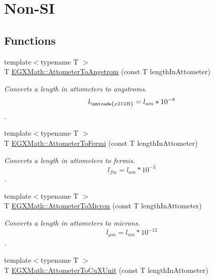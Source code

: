 \hypertarget{group___e_g_x_math-_conversions-_length_conversions-_s_i-_attometer-_non-_s_i}{}\section{Non-\/\+SI}
\label{group___e_g_x_math-_conversions-_length_conversions-_s_i-_attometer-_non-_s_i}
\subsection*{Functions}
\begin{DoxyCompactItemize}
\item 
{\footnotesize template$<$typename T $>$ }\\T \mbox{\hyperlink{group___e_g_x_math-_conversions-_length_conversions-_s_i-_attometer-_non-_s_i_ga331ff6e8159f6f00bb7a20e39fa4d756}{E\+G\+X\+Math\+::\+Attometer\+To\+Angstrom}} (const T length\+In\+Attometer)
\begin{DoxyCompactList}\small\item\em Converts a length in attometers to angstroms. \[ l_{\unicode{x212B}}=l_{am} * 10^{-8} \]. \end{DoxyCompactList}\item 
{\footnotesize template$<$typename T $>$ }\\T \mbox{\hyperlink{group___e_g_x_math-_conversions-_length_conversions-_s_i-_attometer-_non-_s_i_ga7dc342fa730e646b020d60aa6c2848ef}{E\+G\+X\+Math\+::\+Attometer\+To\+Fermi}} (const T length\+In\+Attometer)
\begin{DoxyCompactList}\small\item\em Converts a length in attometers to fermis. \[ l_{fm}=l_{am} * 10^{-3} \]. \end{DoxyCompactList}\item 
{\footnotesize template$<$typename T $>$ }\\T \mbox{\hyperlink{group___e_g_x_math-_conversions-_length_conversions-_s_i-_attometer-_non-_s_i_ga9aaf945221fbc8d469121e0fd0980b41}{E\+G\+X\+Math\+::\+Attometer\+To\+Micron}} (const T length\+In\+Attometer)
\begin{DoxyCompactList}\small\item\em Converts a length in attometers to microns. \[ l_{\mu m}=l_{am} * 10^{-12} \]. \end{DoxyCompactList}\item 
{\footnotesize template$<$typename T $>$ }\\T \mbox{\hyperlink{group___e_g_x_math-_conversions-_length_conversions-_s_i-_attometer-_non-_s_i_gabd388c2e0821ac9066b4fb87e35402b1}{E\+G\+X\+Math\+::\+Attometer\+To\+Cu\+X\+Unit}} (const T length\+In\+Attometer)

\end{DoxyCompactItemize}

